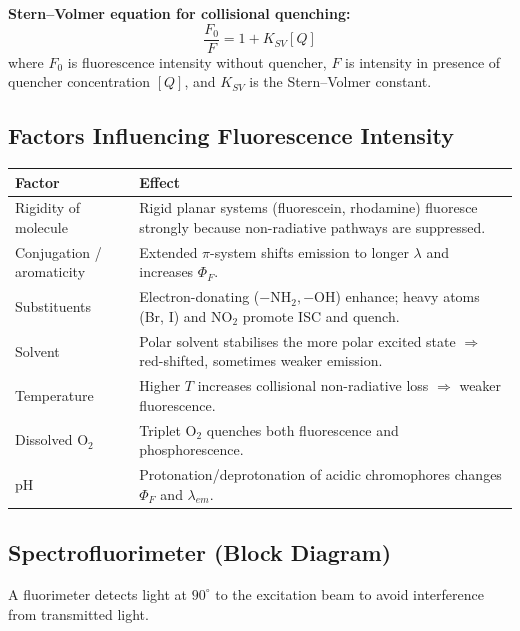 \documentclass[12pt,a4paper]{article}
\begin{document}
\textbf{Stern--Volmer equation for collisional quenching:}
\[
\frac{F_0}{F}=1+K_{SV}[Q]
\]
where $F_0$ is fluorescence intensity without quencher, $F$ is intensity in presence of quencher concentration $[Q]$, and $K_{SV}$ is the Stern--Volmer constant.

\subsection{Factors Influencing Fluorescence Intensity}
\begin{tabularx}{\linewidth}{|B{3.4cm}|Y|}
\hline
\textbf{Factor} & \textbf{Effect} \\
\hline
Rigidity of molecule & Rigid planar systems (fluorescein, rhodamine) fluoresce strongly because non-radiative pathways are suppressed. \\
\hline
Conjugation / aromaticity & Extended $\pi$-system shifts emission to longer $\lambda$ and increases $\Phi_F$. \\
\hline
Substituents & Electron-donating ($-\mathrm{NH_2}, -\mathrm{OH}$) enhance; heavy atoms (Br, I) and $\mathrm{NO_2}$ promote ISC and quench. \\
\hline
Solvent & Polar solvent stabilises the more polar excited state $\Rightarrow$ red-shifted, sometimes weaker emission. \\
\hline
Temperature & Higher $T$ increases collisional non-radiative loss $\Rightarrow$ weaker fluorescence. \\
\hline
Dissolved $\mathrm{O_2}$ & Triplet $\mathrm{O_2}$ quenches both fluorescence and phosphorescence. \\
\hline
pH & Protonation/deprotonation of acidic chromophores changes $\Phi_F$ and $\lambda_{em}$. \\
\hline
\end{tabularx}

\subsection{Spectrofluorimeter (Block Diagram)}
A fluorimeter detects light at $90^{\circ}$ to the excitation beam to avoid interference from transmitted light.
\end{document}
